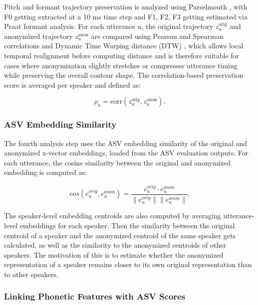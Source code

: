 \documentclass[12pt,leqno,a4paper]{article}
\begin{document}
Pitch and formant trajectory preservation is analyzed using Parselmouth \citep{parselmouth}, with F0 getting extracted at a 10 ms time step and
 F1, F2, F3 getting estimated via Praat \citep{praat} formant analysis. For each utterance $u$, the original trajectory $z_u^{\mathrm{orig}}$ and anonymized trajectory $z_u^{\mathrm{anon}}$ are compared using 
Pearson and Spearman correlations and Dynamic Time Warping distance 
(DTW) \citep{stent_dynamic_2024}, which allows local temporal realignment before computing distance and is therefore suitable for cases where anonymization slightly stretches or compresses utterance timing while preserving the overall contour shape. 
The correlation-based preservation score is averaged per speaker and defined as:

\begin{equation}
\rho_u = \mathrm{corr}(z_u^{\mathrm{orig}}, z_u^{\mathrm{anon}}).
\end{equation}

\subsubsection{ASV Embedding Similarity}
\label{subsec:asv_embedding_similarity}

The fourth analysis step uses the ASV embedding similarity of the original and anonymized x-vector embeddings, loaded from the ASV evaluation outputs. For each utterance, the cosine similarity between the original and anonymized embedding is computed as:

\begin{equation}
cos(e_u^{orig}, e_u^{anon}) =
\frac{e_u^{orig} \cdot e_u^{anon}}
{\|e_u^{orig}\| \|e_u^{anon}\|}.
\end{equation}

The speaker-level embedding centroids are also computed by averaging utterance-level embeddings for each speaker. Then the similarity between the original centroid of a speaker and the anonymized centroid of the same speaker gets calculated, as well as the similarity to the anonymized centroids of other speakers. The motivation of this is to estimate whether the anonymized representation of a speaker remains closer to its own original representation than to other speakers.

\subsubsection{Linking Phonetic Features with ASV Scores}
\label{subsec:linking_phonetic_features_with_asv_scores}
\end{document}
